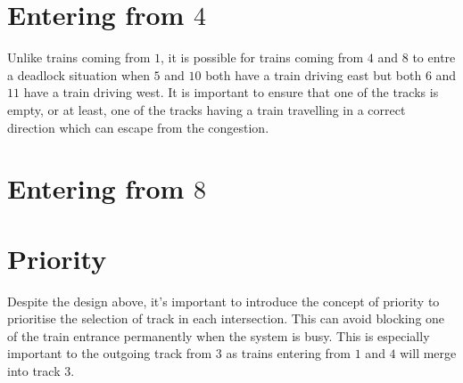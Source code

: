 \documentclass[12pt]{article}
\begin{document}
\section{Entering from $4$}

Unlike trains coming from $1$, it is possible for trains coming from $4$ and $8$ to entre a deadlock situation when $5$ and $10$ both have a train driving east but both $6$ and $11$ have a train driving west. It is important to ensure that one of the tracks is empty, or at least, one of the tracks having a train travelling in a correct direction which can escape from the congestion.

\section{Entering from $8$}

\section{Priority}

Despite the design above, it's important to introduce the concept of priority to prioritise the selection of track in each intersection. This can avoid blocking one of the train entrance permanently when the system is busy. This is especially important to the outgoing track from $3$ as trains entering from $1$ and $4$ will merge into track $3$.
\end{document}
